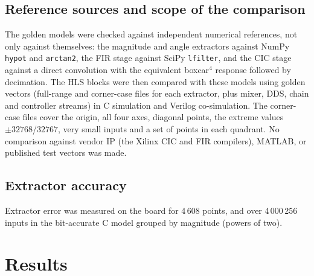 \documentclass[journal]{IEEEtran}
\begin{document}
\subsection{Reference sources and scope of the comparison}
The golden models were checked against independent numerical references, not only against themselves: the magnitude and angle extractors against NumPy \texttt{hypot} and \texttt{arctan2}, the FIR stage against SciPy \texttt{lfilter}, and the CIC stage against a direct convolution with the equivalent boxcar$^4$ response followed by decimation. The HLS blocks were then compared with these models using golden vectors (full-range and corner-case files for each extractor, plus mixer, DDS, chain and controller streams) in C simulation and Verilog co-simulation. The corner-case files cover the origin, all four axes, diagonal points, the extreme values $\pm32768$/$32767$, very small inputs and a set of points in each quadrant. No comparison against vendor IP (the Xilinx CIC and FIR compilers), MATLAB, or published test vectors was made.
\subsection{Extractor accuracy}
Extractor error was measured on the board for 4\,608 points, and over 4\,000\,256 inputs in the bit-accurate C model grouped by magnitude (powers of two).

\section{Results}
\end{document}
